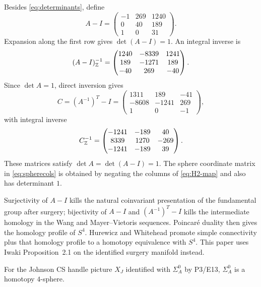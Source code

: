 Besides \eqref{eq:determinants}, define
\begin{equation}\label{eq:A-minus-I}
A-I=
\begin{pmatrix}
-1&269&1240\\
0&40&189\\
1&0&31
\end{pmatrix}.
\end{equation}
Expansion along the first row gives $\det(A-I)=1$.  An integral inverse is
\begin{equation}\label{eq:B-inverse}
(A-I)^{-1}_{\mathbb{Z}}=
\begin{pmatrix}
1240&-8339&1241\\
189&-1271&189\\
-40&269&-40
\end{pmatrix}.
\end{equation}
Since $\det A=1$, direct inversion gives
\begin{equation}\label{eq:H2-map}
C=(A^{-1})^T-I=
\begin{pmatrix}
1311&189&-41\\
-8608&-1241&269\\
1&0&-1
\end{pmatrix},
\end{equation}
with integral inverse
\begin{equation}\label{eq:H2-inverse}
C^{-1}_{\mathbb{Z}}=
\begin{pmatrix}
-1241&-189&40\\
8339&1270&-269\\
-1241&-189&39
\end{pmatrix}.
\end{equation}
These matrices satisfy $\det A=\det(A-I)=1$.  The sphere coordinate matrix in
\eqref{eq:spherecols} is obtained by negating the columns of
\eqref{eq:H2-map} and also has determinant $1$.

\begin{remark}\label{rem:long-topology-route}
Surjectivity of $A-I$ kills the natural coinvariant presentation of the
fundamental group after surgery; bijectivity of $A-I$ and $(A^{-1})^T-I$
kills the intermediate homology in the Wang and Mayer--Vietoris sequences.
Poincar\'e duality then gives the homology profile of $S^4$.  Hurewicz and
Whitehead promote simple connectivity plus that homology profile to a
homotopy equivalence with $S^4$.  This paper uses Iwaki
Proposition~2.1 on the identified surgery manifold instead.
\end{remark}

\begin{corollary}
\label{cor:homotopy-sphere}
For the Johnson CS handle picture $X_J$ identified with $\Sigma_A^0$ by
P3/E13, $\Sigma_A^0$ is a homotopy $4$-sphere.
\end{corollary}

